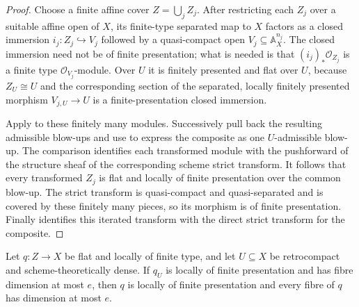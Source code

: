 \begin{proof}
  Choose a finite affine cover $Z=\bigcup_j Z_j$.  After restricting each
  $Z_j$ over a suitable affine open of $X$, its finite-type separated map to
  $X$ factors as a closed immersion
  $i_j\colon Z_j\hookrightarrow V_j$ followed by a quasi-compact open
  $V_j\subseteq\mathbb A_X^{n_j}$.  The closed immersion need not be of finite
  presentation; what is needed is that $(i_j)_*\mathcal O_{Z_j}$ is a finite
  type $\mathcal O_{V_j}$-module.  Over $U$ it is finitely presented and flat
  over $U$, because $Z_U\cong U$ and the corresponding section of the
  separated, locally finitely presented morphism $V_{j,U}\to U$ is a
  finite-presentation closed immersion.

  Apply  to these finitely many
  modules.  Successively pull back the resulting admissible blow-ups and use
   to express the composite as one
  $U$-admissible blow-up.  The comparison
   identifies
  each transformed module with the pushforward of the structure sheaf of the
  corresponding scheme strict transform.  It follows that every transformed
  $Z_j$ is flat and locally of finite presentation over the common blow-up.
  The strict transform is quasi-compact and quasi-separated and is covered by
  these finitely many pieces, so its morphism is of finite presentation.
  Finally  identifies this
  iterated transform with the direct strict transform for the composite.
\end{proof}

\begin{lemma}
  \label{lemma:nagata-dense-open-dimension-package}

  Let $q\colon Z\to X$ be flat and locally of finite type, and let $U\subseteq X$
  be retrocompact and scheme-theoretically dense.  If $q_U$ is locally of
  finite presentation and has fibre dimension at most $e$, then $q$ is locally
  of finite presentation and every fibre of $q$ has dimension at most $e$.
\end{lemma}

